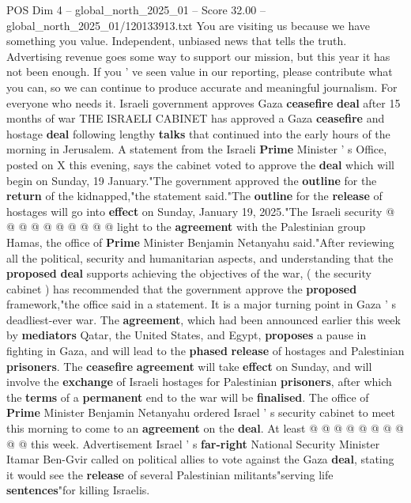 \begin{textsample}{POS Dim 4 – global\_north\_2025\_01 – Score 32.00 – global\_north\_2025\_01/120133913.txt}  \label{ex:f4_pos_043}
You are visiting us because we have something you value.
Independent, unbiased news that tells the truth.
Advertising revenue goes some way to support our mission, but this year it has not been enough.
If you ' ve seen value in our reporting, please contribute what you can, so we can continue to produce accurate and meaningful journalism.
For everyone who needs it.
Israeli government approves Gaza \textbf{ceasefire} \textbf{deal} after 15 months of war THE ISRAELI CABINET has approved a Gaza \textbf{ceasefire} and hostage \textbf{deal} following lengthy \textbf{talks} that continued into the early hours of the morning in Jerusalem.
A statement from the Israeli \textbf{Prime} Minister ' s Office, posted on X this evening, says the cabinet voted to approve the \textbf{deal} which will begin on Sunday, 19 January."The government approved the \textbf{outline} for the \textbf{return} of the kidnapped,"the statement said."The \textbf{outline} for the \textbf{release} of hostages will go into \textbf{effect} on Sunday, January 19, 2025."The Israeli security @ @ @ @ @ @ @ @ @ @ light to the \textbf{agreement} with the Palestinian group Hamas, the office of \textbf{Prime} Minister Benjamin Netanyahu said."After reviewing all the political, security and humanitarian aspects, and understanding that the \textbf{proposed} \textbf{deal} supports achieving the objectives of the war, ( the security cabinet ) has recommended that the government approve the \textbf{proposed} framework,"the office said in a statement.
It is a major turning point in Gaza ' s deadliest-ever war.
The \textbf{agreement}, which had been announced earlier this week by \textbf{mediators} Qatar, the United States, and Egypt, \textbf{proposes} a pause in fighting in Gaza, and will lead to the \textbf{phased} \textbf{release} of hostages and Palestinian \textbf{prisoners}.
The \textbf{ceasefire} \textbf{agreement} will take \textbf{effect} on Sunday, and will involve the \textbf{exchange} of Israeli hostages for Palestinian \textbf{prisoners}, after which the \textbf{terms} of a \textbf{permanent} end to the war will be \textbf{finalised}.
The office of \textbf{Prime} Minister Benjamin Netanyahu ordered Israel ' s security cabinet to meet this morning to come to an \textbf{agreement} on the \textbf{deal}.
At least @ @ @ @ @ @ @ @ @ @ this week.
Advertisement Israel ' s \textbf{far-right} National Security Minister Itamar Ben-Gvir called on political allies to vote against the Gaza \textbf{deal}, stating it would see the \textbf{release} of several Palestinian militants"serving life \textbf{sentences}"for killing Israelis.

\end{textsample}
